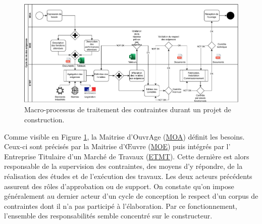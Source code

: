 \documentclass[a4paper,12pt]{article}
\begin{document}
\begin{figure}[htbp]
\centering
\includegraphics[width=.9\linewidth]{../svg/BPMN-LifeCycle-Exigences-init.pdf}
\caption{\label{fig:org0a4a908}Macro-processus de traitement des contraintes durant un projet de construction.}
\end{figure}

Comme visible en Figure \ref{fig:org0a4a908}, la Maitrise d’OuvrAge
 (\protect\hyperlink{gls-8}{\label{gls-8-use-1}MOA}) définit les besoins. Ceux-ci sont précisés par la Maitrise d'Œuvre
 (\protect\hyperlink{gls-9}{\label{gls-9-use-1}MOE}) puis intégrés par l' Entreprise Titulaire d'un Marché de Travaux
 (\protect\hyperlink{gls-10}{\label{gls-10-use-1}ETMT}). Cette dernière est alors responsable de la supervision des contraintes, des moyens d’y répondre, de la réalisation des études et de l'exécution des travaux. Les deux acteurs précédents assurent des rôles d'approbation ou de support. On constate qu’on impose généralement au dernier acteur d’un cycle de conception le respect d’un corpus de contraintes dont il n’a pas participé à l’élaboration. Par ce fonctionnement, l’ensemble des responsabilités semble concentré sur le constructeur.
\end{document}
